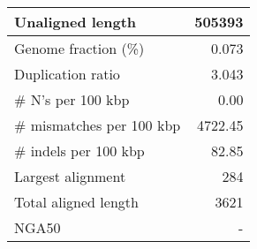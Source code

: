 \documentclass[12pt,a4paper]{article}
\begin{document}
\begin{table}[ht]
\begin{center}
\begin{tabular}{|l*{1}{|r}|}
Unaligned length & 505393 \\ \hline
Genome fraction (\%) & 0.073 \\ \hline
Duplication ratio & 3.043 \\ \hline
\# N's per 100 kbp & 0.00 \\ \hline
\# mismatches per 100 kbp & 4722.45 \\ \hline
\# indels per 100 kbp & 82.85 \\ \hline
Largest alignment & 284 \\ \hline
Total aligned length & 3621 \\ \hline
NGA50 & - \\ \hline
\end{tabular}
\end{center}
\end{table}
\end{document}

